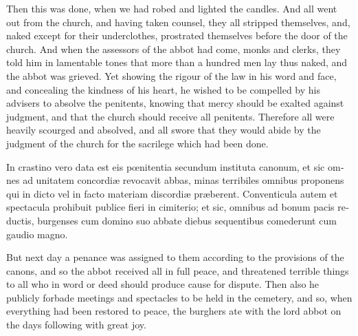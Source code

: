 \documentclass{book}
\begin{document}
\begin{paracol}{2}
\switchcolumn

Then this was done, when we had robed and lighted the candles. And all went out from the church, and having taken counsel, they all stripped themselves, and, naked except for their underclothes, prostrated themselves before the door of the church. And when the assessors of the abbot had come, monks and clerks, they told him in lamentable tones that more than a hundred men lay thus naked, and the abbot was grieved. Yet showing the rigour of the law in his word and face, and concealing the kindness of his heart, he wished to be compelled by his advisers to absolve the penitents, knowing that mercy should be exalted against judgment, and that the church should receive all penitents. Therefore all were heavily scourged and absolved, and all swore that they would abide by the judgment of the church for the sacrilege which had been done.

\switchcolumn*

\begin{otherlanguage}{latin}
In crastino vero data est eis p\oe{}nitentia secundum instituta canonum, et sic omnes ad unitatem concordi\ae{} revocavit abbas, minas terribiles omnibus proponens qui in dicto vel in facto materiam discordi\ae{} pr\ae{}berent. Conventicula autem et spectacula prohibuit  publice fieri in cimiterio; et sic, omnibus ad bonum pacis reductis, burgenses cum domino suo abbate diebus sequentibus comederunt cum gaudio magno.
\end{otherlanguage}

\switchcolumn

But next day a penance was assigned to them according to the provisions of the canons, and so the abbot received all in full peace, and threatened terrible things to all who in word or deed should produce cause for dispute. Then also he publicly forbade meetings and spectacles to be held in the cemetery, and so, when everything had been restored to peace, the burghers ate with the lord abbot on the days following with great joy.

\switchcolumn*


\end{paracol}
\end{document}
